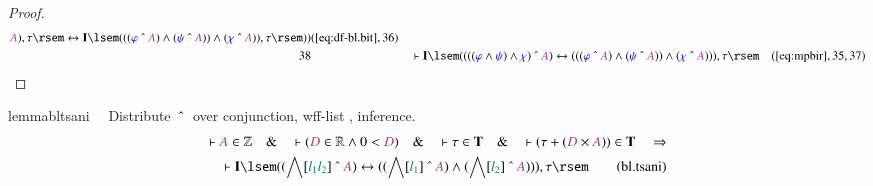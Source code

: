 \begin{proof}
\begin{align}
      \mc{A} ) , \tau \rsem \leftrightarrow \mathbf{I}
      \lsem ( ( ( \mw{\varphi} ~\string^~ \mc{A} ) \wedge (
      \mw{\psi} ~\string^~ \mc{A} ) ) \wedge ( \mw{\chi}
      ~\string^~ \mc{A} ) ) , \tau \rsem )
      )&(\mbox{\ref{eq:df-bl.bit}},36)\notag
  \\ 38 &&  & \vdash \mathbf{I} \lsem ( ( ( ( \mw{\varphi} \wedge \mw{\psi} )
      \wedge \mw{\chi} ) ~\string^~ \mc{A} )
      \leftrightarrow ( ( ( \mw{\varphi} ~\string^~ \mc{A}
      ) \wedge ( \mw{\psi} ~\string^~ \mc{A} ) ) \wedge (
      \mw{\chi} ~\string^~ \mc{A} ) ) ) , \tau
      \rsem&(\mbox{\ref{eq:mpbir}},35,37)\notag
\end{align}
\end{proof}

\begin{restatable}{lemma}{bltsani}~~ Distribute $~\string^~$ over conjunction,
wff-list , inference.
\begin{align}
\vdash \mc{A} \in \mathbb{Z}\quad\&\quad \vdash ( \mc{D} \in \mathbb{R} \wedge
    0 < \mc{D} )\quad\&\quad \vdash \tau \in \mathbf{T}\quad\&\quad \vdash (
    \tau + ( \mc{D} \times \mc{A} ) ) \in \mathbf{T}\quad\Rightarrow \notag \\ %
     \quad \vdash
    \mathbf{I} \lsem ( ( \bigwedge[ \mwl{l_1} \mwl{l_2} ] ~\string^~ \mc{A} )
    \leftrightarrow ( ( \bigwedge[ \mwl{l_1} ] ~\string^~ \mc{A} ) \wedge (
    \bigwedge[ \mwl{l_2} ] ~\string^~ \mc{A} ) ) ) , \tau
    \rsem\label{eq:bl.tsani}\tag{bl.tsani}
\end{align}
\end{restatable}

